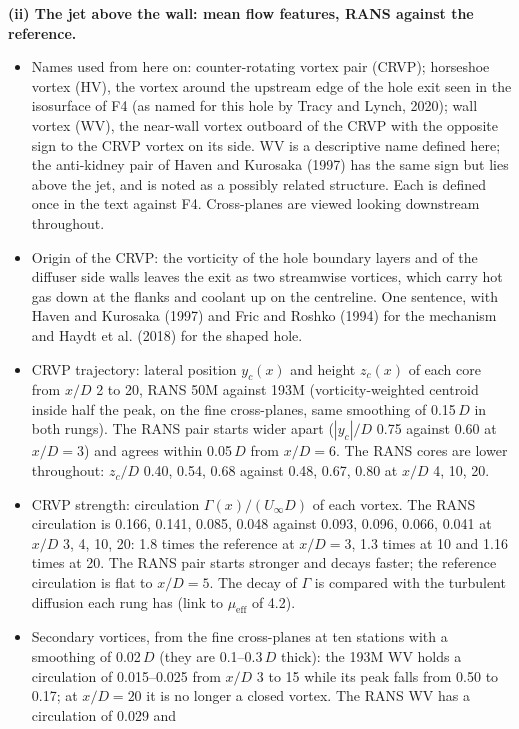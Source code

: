 \documentclass[10pt]{article}
\begin{document}
\textbf{(ii) The jet above the wall: mean flow features, RANS against the reference.}
\begin{itemize}
\item Names used from here on: counter-rotating vortex pair (CRVP); horseshoe vortex (HV), the vortex around the
  upstream edge of the hole exit seen in the isosurface of F4 (as named for this hole by Tracy and Lynch, 2020);
  wall vortex (WV), the near-wall vortex outboard of the CRVP with the opposite sign to the CRVP vortex on its
  side. WV is a descriptive name defined here; the anti-kidney pair of Haven and Kurosaka (1997) has the same
  sign but lies above the jet, and is noted as a possibly related structure. Each is defined once in the text
  against F4. Cross-planes are viewed looking downstream throughout.
\item Origin of the CRVP: the vorticity of the hole boundary layers and of the diffuser side walls leaves the exit
  as two streamwise vortices, which carry hot gas down at the flanks and coolant up on the centreline. One
  sentence, with Haven and Kurosaka (1997) and Fric and Roshko (1994) for the mechanism and Haydt et al. (2018)
  for the shaped hole.
\item CRVP trajectory: lateral position $y_c(x)$ and height $z_c(x)$ of each core from $x/D$ 2 to 20, RANS 50M
  against 193M (vorticity-weighted centroid inside half the peak, on the fine cross-planes, same smoothing of
  0.15\,$D$ in both rungs). The RANS pair starts wider apart ($|y_c|/D$ 0.75 against 0.60 at $x/D=3$) and
  agrees within 0.05\,$D$ from $x/D=6$. The RANS cores are lower throughout: $z_c/D$ 0.40, 0.54, 0.68 against
  0.48, 0.67, 0.80 at $x/D$ 4, 10, 20.
\item CRVP strength: circulation $\Gamma(x)/(U_\infty D)$ of each vortex. The RANS circulation is 0.166, 0.141,
  0.085, 0.048 against 0.093, 0.096, 0.066, 0.041 at $x/D$ 3, 4, 10, 20: 1.8 times the reference at $x/D=3$,
  1.3 times at 10 and 1.16 times at 20. The RANS pair starts stronger and decays faster; the reference
  circulation is flat to $x/D=5$. The decay of $\Gamma$ is compared with the turbulent diffusion each rung has
  (link to $\mu_{\mathrm{eff}}$ of 4.2).
\item Secondary vortices, from the fine cross-planes at ten stations with a smoothing of 0.02\,$D$ (they are
  0.1--0.3\,$D$ thick): the 193M WV holds a circulation of 0.015--0.025 from $x/D$ 3 to 15 while its peak falls
  from 0.50 to 0.17; at $x/D=20$ it is no longer a closed vortex. The RANS WV has a circulation of 0.029 and

\end{itemize}
\end{document}

